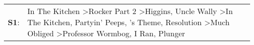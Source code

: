 \begin{supertabular}{p{0.03\textwidth}p{0.92\textwidth}}
 \textbf{S1}:  &  In The Kitchen\textsuperscript{} \textgreater \enspace Rocker Part 2\textsuperscript{} \textgreater \enspace Higgins\textsuperscript{}, \enspace Uncle Wally\textsuperscript{} \textgreater \enspace In The Kitchen\textsuperscript{}, \enspace Partyin' Peeps\textsuperscript{}, 's Theme\textsuperscript{}, \enspace Resolution\textsuperscript{} \textgreater \enspace Much Obliged\textsuperscript{} \textgreater \enspace Professor Wormbog\textsuperscript{}, \enspace I Ran\textsuperscript{}, \enspace Plunger\textsuperscript{}  \enspace  \\
\end{supertabular}
